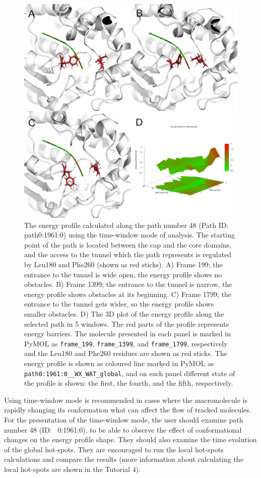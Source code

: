 \documentclass[9pt,tutorial, pubversion]{livecoms}
\begin{document}
\begin{figure}[ht!]
\centering
\includegraphics{Tut4.6.png}
\caption{The energy profile calculated along the path number 48 (Path ID: path0:1961:0) using the time-window mode of analysis. The starting point of the path is located between the cap and the core domains, and the access to the tunnel which the path represents is regulated by Leu180 and Phe260 (shown as red sticks). A) Frame 199; the entrance to the tunnel is wide open, the energy profile shows no obstacles. B) Frame 1399; the entrance to the tunnel is narrow, the energy profile shows obstacles at its beginning. C) Frame 1799; the entrance to the tunnel gets wider, so the energy profile shows smaller obstacles. D) The 3D plot of the energy profile along the selected path in 5 windows. The red parts of the profile represents energy barriers. The molecule presented in each panel is marked in PyMOL as \texttt{frame\_199}, \texttt{frame\_1399}, and \texttt{frame\_1799}, respectively and the Leu180 and Phe260 residues are shown as red sticks. The energy profile is shown as coloured line marked in PyMOL as \texttt{path0:1961:0\_\_WX\_WAT\_global}, and on each panel different state of the profile is shown: the first, the fourth, and the fifth, respectively.}
\label{Tut4.6}
\end{figure}

Using time-window mode is recommended in cases where the macromolecule is rapidly changing its conformation what can affect the flow of tracked molecules. For the presentation of the time-window mode, the user should examine path number 48 (ID:~ 0:1961:0), to be able to observe the effect of conformational changes on the energy profile shape. They should also examine the time evolution of the global hot-spots. They are encouraged to run the local hot-spots calculations and compare the results (more information about calculating the local hot-spots are shown in the Tutorial 4).
\end{document}
